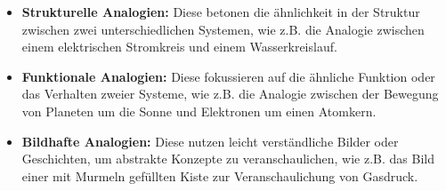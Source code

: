 \begin{itemize}
\item{\textbf{Strukturelle Analogien:} Diese betonen die \"{a}hnlichkeit in der Struktur zwischen zwei unterschiedlichen Systemen, wie z.B. die Analogie zwischen einem elektrischen Stromkreis und einem Wasserkreislauf.}
\item{\textbf{Funktionale Analogien:} Diese fokussieren auf die \"{a}hnliche Funktion oder das Verhalten zweier Systeme, wie z.B. die Analogie zwischen der Bewegung von Planeten um die Sonne und Elektronen um einen Atomkern.}
\item{\textbf{Bildhafte Analogien:} Diese nutzen leicht verst\"{a}ndliche Bilder oder Geschichten, um abstrakte Konzepte zu veranschaulichen, wie z.B. das Bild einer mit Murmeln gef\"{u}llten Kiste zur Veranschaulichung von Gasdruck.}
\end{itemize}



